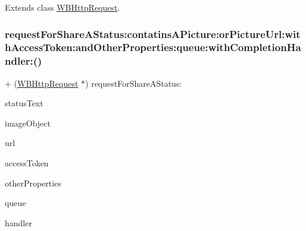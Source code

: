 Extends class \mbox{\hyperlink{interface_w_b_http_request_ad1a9992eb9534605e3b5d1100a2e693a}{W\+B\+Http\+Request}}.

\mbox{\label{category_w_b_http_request_07_weibo_share_08_ad1a9992eb9534605e3b5d1100a2e693a}} 
\subsubsection{\texorpdfstring{request\+For\+Share\+A\+Status\+:contatins\+A\+Picture\+:or\+Picture\+Url\+:with\+Access\+Token\+:and\+Other\+Properties\+:queue\+:with\+Completion\+Handler\+:()}{requestForShareAStatus:contatinsAPicture:orPictureUrl:withAccessToken:andOtherProperties:queue:withCompletionHandler:()}\hspace{0.1cm}{\footnotesize\ttfamily [2/3]}}
{\footnotesize\ttfamily + (\mbox{\hyperlink{interface_w_b_http_request}{W\+B\+Http\+Request}} $\ast$) request\+For\+Share\+A\+Status\+: \begin{DoxyParamCaption}\item[{(N\+S\+String $\ast$)}]{status\+Text }\item[{contatinsAPicture:(\mbox{\hyperlink{interface_w_b_image_object}{W\+B\+Image\+Object}} $\ast$)}]{image\+Object }\item[{orPictureUrl:(N\+S\+String $\ast$)}]{url }\item[{withAccessToken:(N\+S\+String $\ast$)}]{access\+Token }\item[{andOtherProperties:(N\+S\+Dictionary $\ast$)}]{other\+Properties }\item[{queue:(N\+S\+Operation\+Queue $\ast$)}]{queue }\item[{withCompletionHandler:(W\+B\+Request\+Handler)}]{handler }\end{DoxyParamCaption}}

